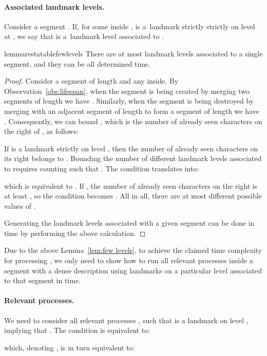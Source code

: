 \documentclass{article}[11pt,letter]
\begin{document}
\paragraph{Associated landmark levels.} Consider a segment . If, for some  inside ,  is a~landmark strictly strictly on
level  at , we say that  is a~landmark level associated to .

\begin{restatable}{lemma}{restatablefewlevels}
\label{lem:few levels}
There are at most  landmark levels associated to a single segment, and they can be all determined
 time.
\end{restatable}

\begin{proof}
Consider a segment  of length  and any  inside. By Observation~\ref{obs:lifespan}, when the segment is being created
by merging two segments of length  we have . Similarly, when the segment is being destroyed
by merging with an adjacent segment of length  to form a segment of length  we have . Consequently, we can bound , which is the number of already seen characters on the right of , as follows:

If  is a landmark strictly on level , then the number of already seen characters on its right belongs to
. Bounding the number of different
landmark levels associated to  requires counting  such that 
.
The condition translates into:

which is equivalent to . If , the number of already seen characters on
the right is at least , so the condition becomes .
All in all, there are at most  different possible values of .

Generating the landmark levels associated with a given segment can be done in  time by performing the above calculation.
\end{proof}

Due to the above Lemma~\ref{lem:few levels}, to achieve the claimed  time complexity for processing ,
we only need to show how to run all relevant processes inside a segment with a dense description using landmarks on a particular level
 associated to that segment in  time.


\paragraph{Relevant processes.} We need to consider all relevant processes , such that  is a landmark on level , implying that
. The condition is equivalent to:

which, denoting , is in turn equivalent to:
\end{document}
